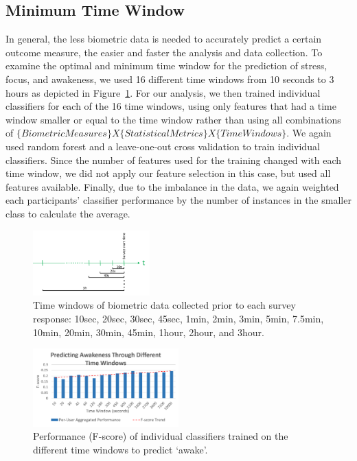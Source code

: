 \subsection{Minimum Time Window}\label{secMinimumTW}
In general, the less biometric data is needed to accurately predict a certain outcome measure, the easier and faster the analysis and data collection. To examine the optimal and minimum time window for the prediction of stress, focus, and awakeness, we used 16 different time windows from 10 seconds to 3 hours as depicted in Figure~\ref{timeWindows}. For our analysis, we then trained individual classifiers for each of the 16 time windows, using only features that had a time window smaller or equal to the time window rather than using all combinations of $\{Biometric Measures\} X \{Statistical Metrics\} X \{Time Windows\}$. We again used random forest and a leave-one-out cross validation to train individual classifiers. Since the number of features used for the training changed with each time window, we did not apply our feature selection in this case, but used all features available. Finally, due to the imbalance in the data, we again weighted each participants' classifier performance by the number of instances in the smaller class to calculate the average.

\begin{figure}
  \centering
      \includegraphics[width=0.4\textwidth]{timeWindows.png}
  \caption{Time windows of biometric data collected prior to each survey response: 10sec, 20sec, 30sec, 45sec, 1min, 2min, 3min, 5min, 7.5min, 10min, 20min, 30min, 45min, 1hour, 2hour, and 3hour.}
   \label{timeWindows}
\end{figure}



\begin{figure}
  \centering
      \includegraphics[width=0.5\textwidth]{20180912AwakenessTWBars.png}
  \caption{Performance (F-score) of individual classifiers trained on the different time windows to predict `awake'.}
  \label{timeWindowsPandR}
  \vspace*{-3mm}
\end{figure}

